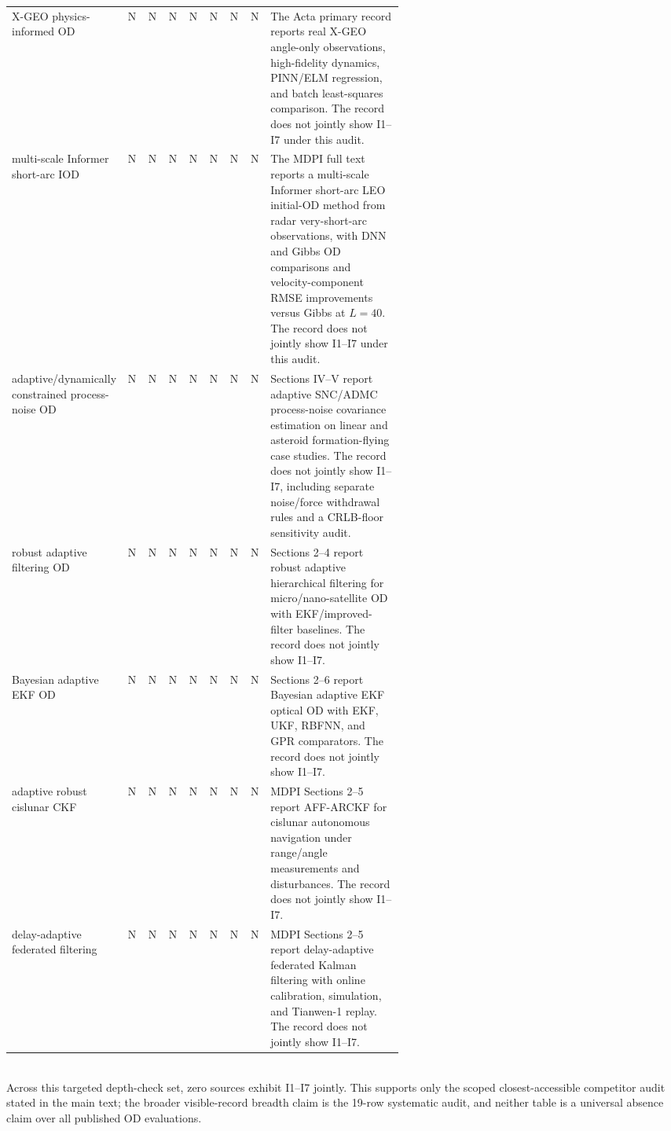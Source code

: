 \begin{table}[t]
{\begin{tabular}{p{0.24\linewidth}cccccccp{0.34\linewidth}}
    \cite{scorsoglio2026xgeo} X-GEO physics-informed OD & N & N & N & N & N & N & N & The Acta primary record reports real X-GEO angle-only observations, high-fidelity dynamics, PINN/ELM regression, and batch least-squares comparison. The record does not jointly show I1--I7 under this audit. \\
    \cite{zhu2026multiscale} multi-scale Informer short-arc IOD & N & N & N & N & N & N & N & The MDPI full text reports a multi-scale Informer short-arc LEO initial-OD method from radar very-short-arc observations, with DNN and Gibbs OD comparisons and velocity-component RMSE improvements versus Gibbs at $L=40$. The record does not jointly show I1--I7 under this audit. \\
    \cite{stacey2021adaptive} adaptive/dynamically constrained process-noise OD & N & N & N & N & N & N & N & Sections IV--V report adaptive SNC/ADMC process-noise covariance estimation on linear and asteroid formation-flying case studies. The record does not jointly show I1--I7, including separate noise/force withdrawal rules and a CRLB-floor sensitivity audit. \\
    \cite{chen2024robust} robust adaptive filtering OD & N & N & N & N & N & N & N & Sections 2--4 report robust adaptive hierarchical filtering for micro/nano-satellite OD with EKF/improved-filter baselines. The record does not jointly show I1--I7. \\
    \cite{zhu2025bayesian} Bayesian adaptive EKF OD & N & N & N & N & N & N & N & Sections 2--6 report Bayesian adaptive EKF optical OD with EKF, UKF, RBFNN, and GPR comparators. The record does not jointly show I1--I7. \\
    \cite{xu2026arckf} adaptive robust cislunar CKF & N & N & N & N & N & N & N & MDPI Sections 2--5 report AFF-ARCKF for cislunar autonomous navigation under range/angle measurements and disturbances. The record does not jointly show I1--I7. \\
    \cite{li2026delay} delay-adaptive federated filtering & N & N & N & N & N & N & N & MDPI Sections 2--5 report delay-adaptive federated Kalman filtering with online calibration, simulation, and Tianwen-1 replay. The record does not jointly show I1--I7. \\
    \bottomrule
  \end{tabular}
  }
  \\[2pt] {\footnotesize Across this targeted depth-check set, zero sources exhibit I1--I7 jointly. This supports only the scoped closest-accessible competitor audit stated in the main text; the broader visible-record breadth claim is the 19-row systematic audit, and neither table is a universal absence claim over all published OD evaluations.}
\end{table}
